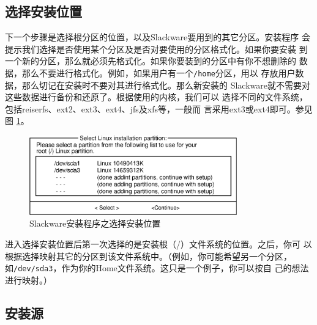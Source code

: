 \subsection{选择安装位置}
\label{sec:installation:setup:target}

下一个步骤是选择根分区的位置，以及Slackware要用到的其它分区。安装程序
会提示我们选择是否使用某个分区及是否对要使用的分区格式化。如果你要安装
到一个新的分区，那么就必须先格式化。如果你要装到的分区中有你不想删除的
数据，那么不要进行格式化。例如，如果用户有一个\texttt{/home}分区，用以
存放用户数据，那么切记在安装时不要对其进行格式化。那么新安装的
Slackware就不需要对这些数据进行备份和还原了。根据使用的内核，我们可以
选择不同的文件系统，包括reiserfs、ext2、ext3、ext4、jfs及xfs等，一般而
言采用ext3或ext4即可。参见图
\ref{fig:setup-target}。
\begin{figure}[htbf]
  \centering
  \includegraphics[width=0.8\textwidth]{images/installation/setup-target.eps}
  \caption{Slackware安装程序之选择安装位置}
  \label{fig:setup-target}
\end{figure}

进入选择安装位置后第一次选择的是安装根（/）文件系统的位置。之后，你可
以根据选择映射其它的分区到该文件系统中。（例如，你可能希望另一个分区，
如\texttt{/dev/sda3}，作为你的Home文件系统。这只是一个例子，你可以按自
己的想法进行映射。）

\subsection{安装源}
\label{sec:installation:setup:source}

